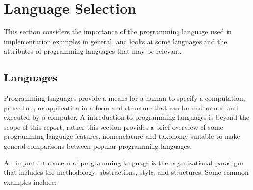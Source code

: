 \documentclass[a4paper, 11pt]{article}
\begin{document}
% 
% 
\section{Language Selection}
\label{sec:language_selection}
This section considers the importance of the programming language used in implementation examples in general, and looks at some languages and the attributes of programming languages that may be relevant.

% 
%
\subsection{Languages}
Programming languages provide a means for a human to specify a computation, procedure, or application in a form and structure that can be understood and executed by a computer.
A introduction to programming languages is beyond the scope of this report, rather this section provides a brief overview of some programming language features, nomenclature and taxonomy suitable to make general comparisons between popular programming languages.

An important concern of programming language is the organizational paradigm that includes the methodology, abstractions, style, and structures. Some common examples include:
\end{document}
